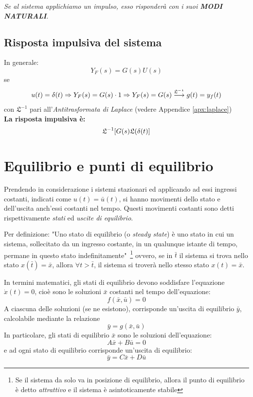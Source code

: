 \documentclass[a4paper]{report}
\begin{document}
\textsl{Se al sistema applichiamo un impulso, esso risponder\`a con i
  suoi \textbf{MODI NATURALI}}. 
\subsection{Risposta impulsiva del sistema}
In generale:
\begin{equation}
  Y_F(s)=G(s)U(s)\label{eq:eqlaprispf}
\end{equation}
se 
$$u(t)=\delta(t) \Rightarrow Y_F(s)=G(s)\cdot 1\Rightarrow
Y_F(s)=G(s) \stackrel
{{\mathfrak{L^{-1}}}}{\longrightarrow}\protect
g(t)=y_f(t)$$ 
con $\mathfrak{L}^{-1}$ pari all'\emph{Antitrasformata di Laplace}
(vedere Appendice \ref{apx:laplace})\\
\textbf{La risposta impulsiva \`e:}
\begin{equation}\label{eq:eqpulseresp}
  \protect\mathfrak{L}^{-1}[G(s)\mathfrak{L}(\delta(t)]
\end{equation}

\section{Equilibrio e punti di equilibrio}
Prendendo in considerazione i sistemi stazionari ed applicando ad essi
ingressi costanti, indicati come $u(t) = \bar{u}(t)$, si hanno
movimenti dello stato e dell'uscita anch'essi costanti nel
tempo. Questi movimenti costanti sono detti rispettivamente {\em
  stati} ed \emph{uscite di equilibrio}.

Per definizione: "Uno stato di equilibrio (o \emph{steady
  state}) \`e 
uno stato in cui un sistema, sollecitato da un ingresso costante, in
un qualunque istante di tempo, permane in questo stato
indefinitamente"~\footnote{Se il sistema da solo va in posizione di
  equilibrio, allora il punto di equilibrio \`e detto
  \emph{attrattivo} e il sistema
  \`e asintoticamente stabile} ovvero, se in $\bar{t}$ il sistema si
trova nello stato $x(\bar{t})=\bar{x}$, allora $\forall t >\bar{t}$,
il sistema si trover\`a nello stesso stato $x(t)=\bar{x}$.

In termini matematici, gli stati di equilibrio devono soddisfare
l'equazione $\dot{x}(t)=0$, cio\`e sono le soluzioni $\bar{x}$
costanti nel tempo dell'equazione: 
\begin{equation}\label{eq:eqsteady}
  f(\bar{x},\bar{u})=0
\end{equation}
A ciascuna delle soluzioni (se ne esistono), corrisponde un'uscita di
equilibrio $\bar{y}$, calcolabile mediante la relazione 
\begin{equation}\label{eq:outsteady}
  \bar{y}=g(\bar{x},\bar{u})
\end{equation}
In particolare, gli stati di equilibrio $\bar{x}$ sono le soluzioni
dell'equazione: 
\begin{equation}
  A\bar{x}+B\bar{u} = 0
\end{equation}
e ad ogni stato di equilibrio corrisponde un'uscita di equilibrio:
\begin{equation}
  \bar{y}=C\bar{x}+D\bar{u}
\end{equation}
\end{document}
